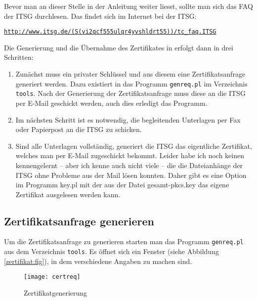 Bevor man an dieser Stelle in der Anleitung weiter liesst, sollte man sich 
das FAQ der ITSG durchlesen. Das findet sich im Internet bei der ITSG:

{\href{http://www.itsg.de/(S(vi2qcf555ulqr4yvshldrt55))/tc_faq.ITSG}{\nolinkurl{http://www.itsg.de/(S(vi2qcf555ulqr4yvshldrt55))/tc_faq.ITSG}}}

Die Generierung und die Übernahme des Zertifikates in \tinyHeb\/ erfolgt
dann in drei Schritten:

\begin{enumerate}
\item
Zunächst muss ein privater Schlüssel und aus diesem eine
Zertifikatsanfrage generiert werden. Dazu existiert in \tinyHeb\/ das
Programm \verb|genreq.pl| im Verzeichnis \verb|tools|. Nach der Generierung
der Zertifikatsanfrage muss diese an die ITSG per E-Mail geschickt werden,
auch dies erledigt das Programm.
\item
Im nächsten Schritt ist es notwendig, die begleitenden Unterlagen per
Fax oder Papierpost an die ITSG zu schicken.
\item
Sind alle Unterlagen vollständig, generiert die ITSG das eigentliche
Zertifikat, welches man per E-Mail zugeschickt bekommt. Leider habe ich
noch keinen kennengelernt -- aber ich kenne auch nicht viele -- die die
Dateianhänge der ITSG ohne Probleme aus der Mail lösen konnten. Daher
gibt es eine Option im Programm key.pl mit der aus der Datei
gesamt-pkcs.key das eigene Zertifikat ausgelesen werden kann.
\end{enumerate}

\subsection{Zertifikatsanfrage generieren}
Um die Zertifikatsanfrage zu generieren starten man das Programm 
\verb|genreq.pl| aus dem Verzeichnis \verb|tools|. Es öffnet sich
ein Fenster (siehe Abbildung \vref{zertifikat:fig}), 
in dem verschiedene Angaben zu machen sind.

\begin{figure}[H]
\centering
\texttt{[image: certreq]}
\caption{\tinyHeb\/ Zertifikatgenerierung\label{zertifikat:fig}}
\end{figure}

